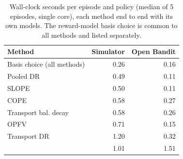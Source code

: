 \begin{table}[t]\centering\scriptsize
\caption{Wall-clock seconds per episode and policy (median of 5 episodes, single core), each method end to end with its own models. The reward-model basis choice is common to all methods and listed separately.}
\label{tab:runtime}
\begin{tabular}{@{}lrr@{}}\toprule
Method & Simulator & Open Bandit \\\midrule
Basis choice (all methods) & 0.26 & 0.16 \\
Pooled DR & 0.49 & 0.11 \\
SLOPE & 0.50 & 0.11 \\
COPE & 0.58 & 0.27 \\
Transport bal. decay & 0.58 & 0.26 \\
OPFV & 0.71 & 0.15 \\
Transport DR & 1.20 & 0.32 \\
\odrift{} & 1.01 & 1.51 \\
\bottomrule\end{tabular}
\end{table}
